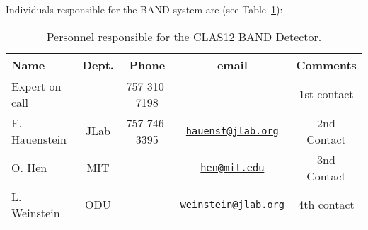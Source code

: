 Individuals responsible for the BAND system are (see Table~\ref{tb:band}):

\begin{table}[!htb]
 \centering
 \begin{tabular}{|l|c|c|c|c|}
\hline
 Name           & Dept.    & Phone        & email                    & Comments \\ \hline
Expert on call  &          & 757-310-7198 &                          & 1st contact \\ \hline
F. Hauenstein   & JLab     & 757-746-3395 & \href{mailto:hauenst@jlab.org}{\nolinkurl{hauenst@jlab.org}}     & 2nd Contact \\ \hline
O. Hen          & MIT      &              & \href{mailto:hen@mit.edu}{\nolinkurl{hen@mit.edu}}               & 3nd Contact \\ \hline
L. Weinstein    & ODU      &              & \href{mailto:weinstein@jlab.org}{\nolinkurl{weinstein@jlab.org}} & 4th contact  \\ \hline
 \end{tabular}
\caption{Personnel responsible for the CLAS12 BAND Detector.} 
\label{tb:band}
\end{table}
